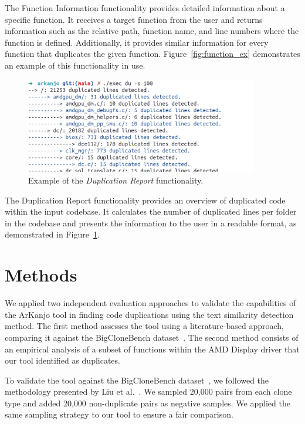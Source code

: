 \documentclass[conference]{IEEEtran}
\begin{document}
The Function Information functionality provides detailed information about a specific function. 
It receives a target function from the user
and returns information such as the relative path, function name, and line numbers where
the function is defined. Additionally, it provides similar information for every function
that duplicates the given function. Figure~\ref{fig:function_ex} demonstrates an
example of this functionality in use.

\begin{figure}[ht]
\centering
\includegraphics[width=4in]{fig/relatory_example.png}
\caption{Example of the \textit{Duplication Report} functionality.}
\label{fig:relatory_ex}
\end{figure}

The Duplication Report functionality provides an overview of
duplicated code within the input codebase. It calculates the number of
duplicated lines per folder in the codebase and presents the information to the user in
a readable format, as demonstrated in Figure~\ref{fig:relatory_ex}.


\section{Methods}

We applied two independent evaluation approaches to validate the capabilities of the ArKanjo tool in finding code duplications using the text similarity detection method. The first method assesses the tool using a literature-based approach,
comparing it against the BigCloneBench dataset~\cite{bigclonebench}. The second
method consists of an empirical analysis of a subset of functions within the AMD Display driver
that our tool identified as duplicates. 

To validate the tool against the BigCloneBench dataset~\cite{bigclonebench}, we followed
the methodology presented by Liu et al.~\cite{tailor}. We sampled 20{,}000 pairs from each clone
type and added 20{,}000 non-duplicate pairs as negative samples. We applied the same sampling
strategy to our tool to ensure a fair comparison.
\end{document}
